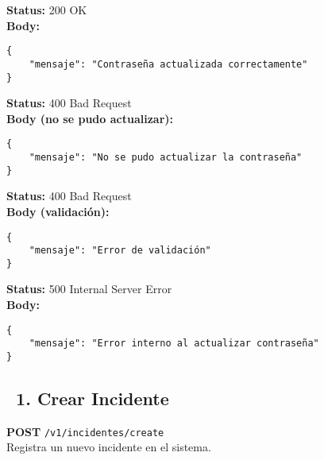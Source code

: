 \begin{tcolorbox}[response]
    \textbf{Status:} 200 OK\\
    \textbf{Body:}
    \begin{verbatim}
{
    "mensaje": "Contraseña actualizada correctamente"
}
    \end{verbatim}
\end{tcolorbox}

\begin{tcolorbox}[response]
    \textbf{Status:} 400 Bad Request\\
    \textbf{Body (no se pudo actualizar):}
    \begin{verbatim}
{
    "mensaje": "No se pudo actualizar la contraseña"
}
    \end{verbatim}
\end{tcolorbox}

\begin{tcolorbox}[response]
    \textbf{Status:} 400 Bad Request\\
    \textbf{Body (validación):}
    \begin{verbatim}
{
    "mensaje": "Error de validación"
}
    \end{verbatim}
\end{tcolorbox}

\begin{tcolorbox}[response]
    \textbf{Status:} 500 Internal Server Error\\
    \textbf{Body:}
    \begin{verbatim}
{
    "mensaje": "Error interno al actualizar contraseña"
}
    \end{verbatim}
\end{tcolorbox}


\subsection*{\faServer\ 1. Crear Incidente}
\begin{tcolorbox}[endpoint]
    \textbf{POST} \texttt{/v1/incidentes/create}\\
    Registra un nuevo incidente en el sistema.
\end{tcolorbox}

